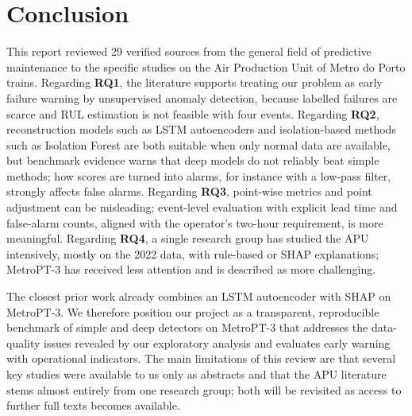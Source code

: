 \section{Conclusion}
\label{sec:conclusion}

This report reviewed 29 verified sources from the general field of predictive maintenance to the specific studies on the Air Production Unit of Metro do Porto trains. Regarding \textbf{RQ1}, the literature supports treating our problem as early failure warning by unsupervised anomaly detection, because labelled failures are scarce and RUL estimation is not feasible with four events. Regarding \textbf{RQ2}, reconstruction models such as LSTM autoencoders and isolation-based methods such as Isolation Forest are both suitable when only normal data are available, but benchmark evidence warns that deep models do not reliably beat simple methods; how scores are turned into alarms, for instance with a low-pass filter, strongly affects false alarms. Regarding \textbf{RQ3}, point-wise metrics and point adjustment can be misleading; event-level evaluation with explicit lead time and false-alarm counts, aligned with the operator's two-hour requirement, is more meaningful. Regarding \textbf{RQ4}, a single research group has studied the APU intensively, mostly on the 2022 data, with rule-based or SHAP explanations; MetroPT-3 has received less attention and is described as more challenging.

The closest prior work already combines an LSTM autoencoder with SHAP on MetroPT-3. We therefore position our project as a transparent, reproducible benchmark of simple and deep detectors on MetroPT-3 that addresses the data-quality issues revealed by our exploratory analysis and evaluates early warning with operational indicators. The main limitations of this review are that several key studies were available to us only as abstracts and that the APU literature stems almost entirely from one research group; both will be revisited as access to further full texts becomes available.
